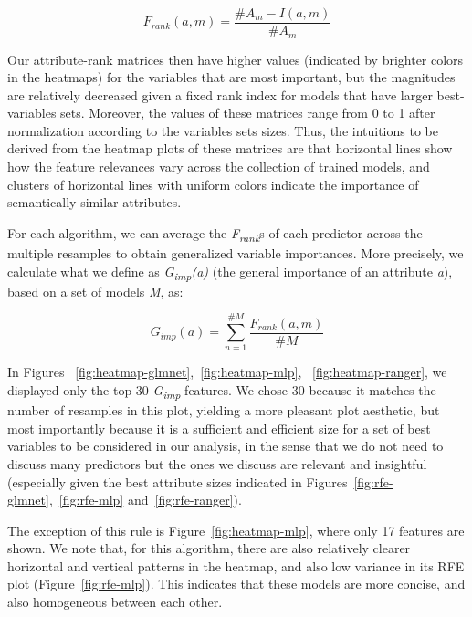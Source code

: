 \begin{equation}
    F_{rank}(a, m) = \frac{\#A_m - I(a, m)}{\#A_m}
\end{equation}

Our attribute-rank matrices then have higher values (indicated by brighter colors in the heatmaps) for the variables that are most important, but the magnitudes are relatively decreased given a fixed rank index for models that have larger best-variables sets.
Moreover, the values of these matrices range from 0 to 1 after normalization according to the variables sets sizes.
Thus, the intuitions to be derived from the heatmap plots of these matrices are that horizontal lines show how the feature relevances vary across the collection of trained models, and clusters of horizontal lines with uniform colors indicate the importance of semantically similar attributes.

For each algorithm, we can average the \textit{F\textsubscript{rank}}s of each predictor across the multiple resamples to obtain generalized variable importances.
More precisely, we calculate what we define as \textit{G\textsubscript{imp}(a)} (the general importance of an attribute \textit{a}), based on a set of models \textit{M}, as:

\begin{equation}
    G_{imp}(a) = \sum_{n=1}^{\#M} \frac{F_{rank}(a,m)}{\#M}
\end{equation}

In Figures ~\ref{fig:heatmap-glmnet},~\ref{fig:heatmap-mlp}, ~\ref{fig:heatmap-ranger}, we displayed only the top-30 \textit{G\textsubscript{imp}} features.
We chose 30 because it matches the number of resamples in this plot, yielding a more pleasant plot aesthetic, but most importantly because it is a sufficient and efficient size for a set of best variables to be considered in our analysis, in the sense that we do not need to discuss many predictors but the ones we discuss are relevant and insightful (especially given the best attribute sizes indicated in Figures~\ref{fig:rfe-glmnet},~\ref{fig:rfe-mlp} and~\ref{fig:rfe-ranger}).

The exception of this rule is Figure~\ref{fig:heatmap-mlp}, where only 17 features are shown.
We note that, for this algorithm, there are also relatively clearer horizontal and vertical patterns in the heatmap, and also low variance in its RFE plot (Figure~\ref{fig:rfe-mlp}).
This indicates that these models are more concise, and also homogeneous between each other.

